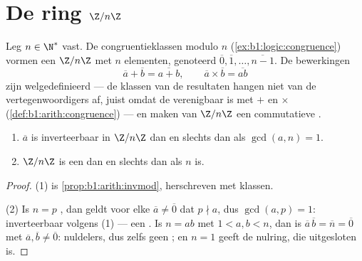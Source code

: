 \section{De ring $\Z/n\Z$}

\begin{definition}\label{def:b1:structures:zn}
Leg $n \in \N^*$ vast. De congruentieklassen modulo $n$
(\cref{ex:b1:logic:congruence}) vormen een 
$\Z/n\Z$ met $n$ elementen, genoteerd $\overline 0,
\overline 1, \dots, \overline{n-1}$. De bewerkingen
\[
\overline a + \overline b = \overline{a + b},
\qquad
\overline a \times \overline b = \overline{ab}
\]
zijn welgedefinieerd --- de klassen van de resultaten hangen niet van de
vertegenwoordigers af, juist omdat de  verenigbaar is met $+$
en $\times$ (\cref{def:b1:arith:congruence}) --- en maken van $\Z/n\Z$
een commutatieve .
\end{definition}

\begin{theorem}\label{thm:b1:structures:zp}
\begin{enumerate}
  \item $\overline a$ is inverteerbaar in $\Z/n\Z$ dan en slechts dan
        als $\gcd(a, n) = 1$.
  \item $\Z/n\Z$ is een  dan en slechts dan als $n$  is.
\end{enumerate}
\end{theorem}

\begin{proof}
(1) is \cref{prop:b1:arith:invmod}, herschreven met klassen.

(2) Is $n = p$ , dan geldt voor elke $\overline a \neq \overline 0$
dat $p \nmid a$, dus $\gcd(a, p) = 1$: inverteerbaar volgens (1) --- een
. Is $n = ab$ met $1 < a, b < n$, dan is $\overline a\, \overline b
= \overline n = \overline 0$ met $\overline a, \overline b \neq \overline
0$: nuldelers, dus zelfs geen ; en $n = 1$ geeft de
nulring, die uitgesloten is.
\end{proof}


